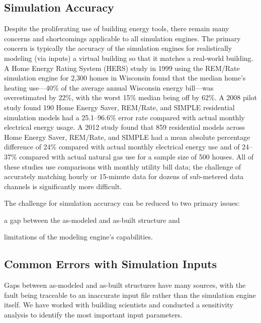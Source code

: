 \documentclass[preprint, review, 12pt]{elsarticle}
\begin{document}
\subsection{Simulation Accuracy}
Despite the proliferating use of building energy tools, there remain many concerns and shortcomings applicable to all simulation engines. The primary concern is typically the accuracy of the simulation engines for realistically modeling (via inputs) a virtual building so that it matches a real-world building. A Home Energy Rating System (HERS) study in 1999 \cite{cit:pigg2001} using the REM/Rate
simulation engine for 2,300 homes in Wisconsin found that the median home's heating use---40\% of the average annual Wisconsin energy bill---was overestimated by 22\%, with the worst 15\% median being off by 62\%. A 2008 pilot study \cite{cit:earthadvantage2009} found 190 Home Energy Saver, REM/Rate, and SIMPLE residential simulation models had a 25.1--96.6\% error rate compared with actual monthly electrical energy usage. A 2012 study \cite{cit:roberts2012} found that 859 residential models across Home Energy Saver, REM/Rate, and SIMPLE had a mean absolute percentage difference of 24\% compared with actual monthly electrical energy use and of 24--37\% compared with actual natural gas use for a sample size of 500 houses. All of these studies use comparisons with monthly utility bill data; the challenge of accurately matching hourly or 15-minute data for dozens of sub-metered data channels is significantly more difficult.

The challenge for simulation accuracy can be reduced to two primary issues: \begin{inparaenum}[(1)]
\item a gap between the as-modeled and as-built structure and 
\item limitations of the modeling engine's capabilities. %
\end{inparaenum}

\subsection{Common Errors with Simulation Inputs}
Gaps between as-modeled and as-built structures have many sources, with the fault being traceable to an inaccurate input file rather than the simulation engine itself. We have worked with building scientists and conducted a sensitivity analysis to identify the most important input parameters.
\end{document}
